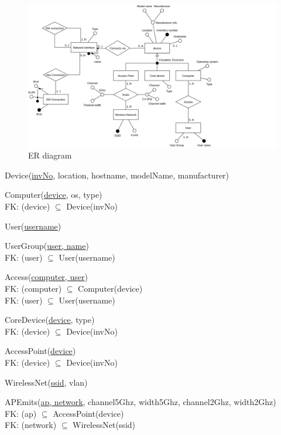 \documentclass[a4paper,10pt]{article}
\begin{document}
\begin{figure}[H]
\centering
\includegraphics[width=15cm]{er.png}
\caption{ER diagram}
\end{figure}

Device(\underline{invNo}, location, hostname, modelName, manufacturer)

Computer(\underline{device}, os, type)\\
\hspace*{1em}FK: (device) \(\subseteq\) Device(invNo)

User(\underline{username})

UserGroup(\underline{user, name})\\
\hspace*{1em}FK: (user) \(\subseteq\) User(username)

Access(\underline{computer, user})\\
\hspace*{1em}FK: (computer) \(\subseteq\) Computer(device)\\
\hspace*{1em}FK: (user) \(\subseteq\) User(username)

CoreDevice(\underline{device}, type)\\
\hspace*{1em}FK: (device) \(\subseteq\) Device(invNo)

AccessPoint(\underline{device})\\
\hspace*{1em}FK: (device) \(\subseteq\) Device(invNo)

WirelessNet(\underline{ssid}, vlan)

APEmits(\underline{ap, network}, channel5Ghz, width5Ghz, channel2Ghz, width2Ghz)\\
\hspace*{1em}FK: (ap) \(\subseteq\) AccessPoint(device)\\
\hspace*{1em}FK: (network) \(\subseteq\) WirelessNet(ssid)
\end{document}
